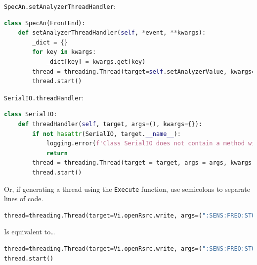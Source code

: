 \documentclass[titlepage]{article}
\begin{document}
\verb|SpecAn.setAnalyzerThreadHandler|:
\begin{lstlisting}[language=Python]
class SpecAn(FrontEnd):
    def setAnalyzerThreadHandler(self, *event, **kwargs):
        _dict = {}
        for key in kwargs:
            _dict[key] = kwargs.get(key)
        thread = threading.Thread(target=self.setAnalyzerValue, kwargs=_dict)
        thread.start()
\end{lstlisting}

\verb|SerialIO.threadHandler|:
\begin{lstlisting}[language=Python]
class SerialIO:
    def threadHandler(self, target, args=(), kwargs={}):
        if not hasattr(SerialIO, target.__name__):
            logging.error(f'Class SerialIO does not contain a method with identifier {target.__name__}')
            return
        thread = threading.Thread(target = target, args = args, kwargs = kwargs, daemon=True)
        thread.start()
\end{lstlisting}

Or, if generating a thread using the \verb|Execute| function, use semicolons to separate lines of code.
\begin{lstlisting}[language=Python]
thread=threading.Thread(target=Vi.openRsrc.write, args=(":SENS:FREQ:STOP 10e9",), daemon=True);thread.start()
\end{lstlisting}
Is equivalent to\dots
\begin{lstlisting}[language=Python]
thread=threading.Thread(target=Vi.openRsrc.write, args=(":SENS:FREQ:STOP 10e9",), daemon=True)
thread.start()
\end{lstlisting}  
\end{document}
